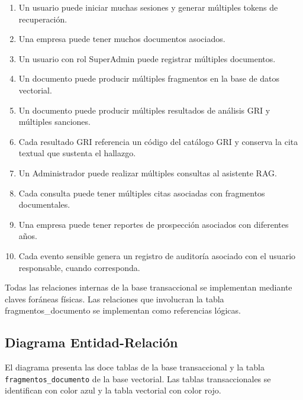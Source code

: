 \begin{enumerate}
    \item Un usuario puede iniciar muchas sesiones y generar múltiples
    tokens de recuperación.

    \item Una empresa puede tener muchos documentos asociados.

    \item Un usuario con rol SuperAdmin puede registrar múltiples
    documentos.

    \item Un documento puede producir múltiples fragmentos en la base
    de datos vectorial.

    \item Un documento puede producir múltiples resultados de análisis
    GRI y múltiples sanciones.

    \item Cada resultado GRI referencia un código del catálogo GRI y
    conserva la cita textual que sustenta el hallazgo.

    \item Un Administrador puede realizar múltiples consultas al
    asistente RAG.

    \item Cada consulta puede tener múltiples citas asociadas con
    fragmentos documentales.

    \item Una empresa puede tener reportes de prospección asociados con
    diferentes años.

    \item Cada evento sensible genera un registro de auditoría asociado
    con el usuario responsable, cuando corresponda.
\end{enumerate}

Todas las relaciones internas de la base transaccional se implementan
mediante claves foráneas físicas. Las relaciones que involucran la tabla
fragmentos\_documento se implementan como referencias lógicas.



\subsection{Diagrama Entidad-Relación}

El diagrama presenta las doce tablas de la base transaccional y la tabla
\texttt{fragmentos\_documento} de la base vectorial. Las tablas
transaccionales se identifican con color azul y la tabla vectorial con
color rojo.

